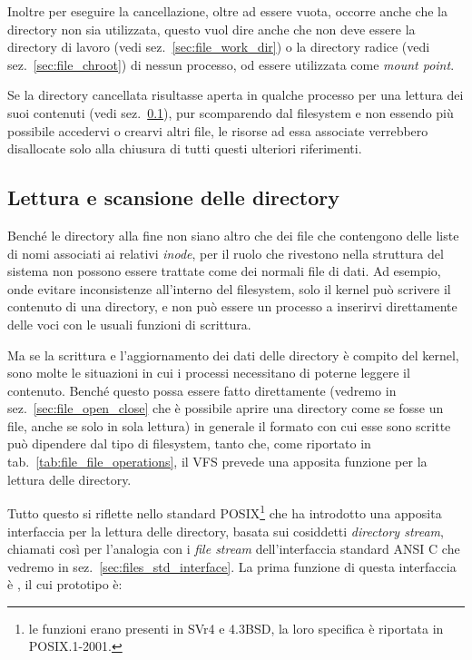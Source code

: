 Inoltre per eseguire la cancellazione, oltre ad essere vuota, occorre anche
che la directory non sia utilizzata, questo vuol dire anche che non deve
essere la directory di lavoro (vedi sez.~\ref{sec:file_work_dir}) o la
directory radice (vedi sez.~\ref{sec:file_chroot}) di nessun processo, od
essere utilizzata come \textit{mount point}.

Se la directory cancellata risultasse aperta in qualche processo per una
lettura dei suoi contenuti (vedi sez.~\ref{sec:file_dir_read}), pur
scomparendo dal filesystem e non essendo più possibile accedervi o crearvi
altri file, le risorse ad essa associate verrebbero disallocate solo alla
chiusura di tutti questi ulteriori riferimenti.


\subsection{Lettura e scansione delle directory}
\label{sec:file_dir_read}

Benché le directory alla fine non siano altro che dei file che contengono
delle liste di nomi associati ai relativi \textit{inode}, per il ruolo che
rivestono nella struttura del sistema non possono essere trattate come dei
normali file di dati. Ad esempio, onde evitare inconsistenze all'interno del
filesystem, solo il kernel può scrivere il contenuto di una directory, e non
può essere un processo a inserirvi direttamente delle voci con le usuali
funzioni di scrittura.

Ma se la scrittura e l'aggiornamento dei dati delle directory è compito del
kernel, sono molte le situazioni in cui i processi necessitano di poterne
leggere il contenuto. Benché questo possa essere fatto direttamente (vedremo
in sez.~\ref{sec:file_open_close} che è possibile aprire una directory come se
fosse un file, anche se solo in sola lettura) in generale il formato con cui
esse sono scritte può dipendere dal tipo di filesystem, tanto che, come
riportato in tab.~\ref{tab:file_file_operations}, il VFS prevede una apposita
funzione per la lettura delle directory.


Tutto questo si riflette nello standard POSIX\footnote{le funzioni erano
  presenti in SVr4 e 4.3BSD, la loro specifica è riportata in POSIX.1-2001.}
che ha introdotto una apposita interfaccia per la lettura delle directory,
basata sui cosiddetti \textit{directory stream}, chiamati così per l'analogia
con i \textit{file stream} dell'interfaccia standard ANSI C che vedremo in
sez.~\ref{sec:files_std_interface}. La prima funzione di questa interfaccia è
, il cui prototipo è:

